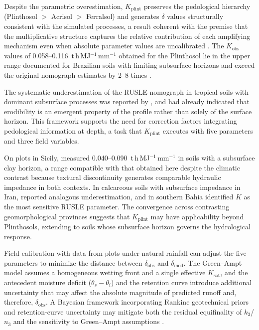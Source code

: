\documentclass[preprint,review,12pt,authoryear]{elsarticle}
\begin{document}
Despite the parametric overestimation, $K_{\mathrm{plint}}$ preserves the pedological hierarchy (Plinthosol $>$ Acrisol $>$ Ferralsol) and generates $\delta$ values structurally consistent with the simulated processes, a result coherent with the premise that the multiplicative structure captures the relative contribution of each amplifying mechanism even when absolute parameter values are uncalibrated \citep{renard_et_al_1997}. The $K_{\mathrm{obs}}$ values of 0.058--0.116~t\,h\,MJ$^{-1}$\,mm$^{-1}$ obtained for the Plinthosol lie in the upper range documented for Brazilian soils with limiting subsurface horizons \citep{lafayette_cantalice_coutinho_2011,cassol_et_al_2023} and exceed the original nomograph estimates by 2--8 times \citep{wischmeier_et_al_1971}.

The systematic underestimation of the RUSLE nomograph in tropical soils with dominant subsurface processes was reported by \citet{alewell_et_al_2019}, and \citet{torri_poesen_2014} had already indicated that erodibility is an emergent property of the profile rather than solely of the surface horizon. This framework supports the need for correction factors integrating pedological information at depth, a task that $K_{\mathrm{plint}}$ executes with five parameters and three field variables.

On plots in Sicily, \citet{bagarello_et_al_2012} measured 0.040--0.090~t\,h\,MJ$^{-1}$\,mm$^{-1}$ in soils with a subsurface clay horizon, a range compatible with that obtained here despite the climatic contrast because textural discontinuity generates comparable hydraulic impedance in both contexts. In calcareous soils with subsurface impedance in Iran, \citet{ostovari_et_al_2016} reported analogous underestimation, and in southern Bahia \citet{francois_et_al_2024} identified $K$ as the most sensitive RUSLE parameter. The convergence across contrasting geomorphological provinces suggests that $K_{\mathrm{plint}}$ may have applicability beyond Plinthosols, extending to soils whose subsurface horizon governs the hydrological response.

Field calibration with data from plots under natural rainfall can adjust the five parameters to minimize the distance between $\delta_{\mathrm{obs}}$ and $\delta_{\mathrm{mod}}$. The Green--Ampt model assumes a homogeneous wetting front and a single effective $K_{\mathrm{sat}}$, and the antecedent moisture deficit ($\theta_s - \theta_i$) and the retention curve introduce additional uncertainty that may affect the absolute magnitude of predicted runoff and, therefore, $\delta_{\mathrm{obs}}$. A Bayesian framework incorporating Rankine geotechnical priors and retention-curve uncertainty may mitigate both the residual equifinality of $k_3$/$n_3$ and the sensitivity to Green--Ampt assumptions \citep{beven_freer_2001}.
\end{document}
